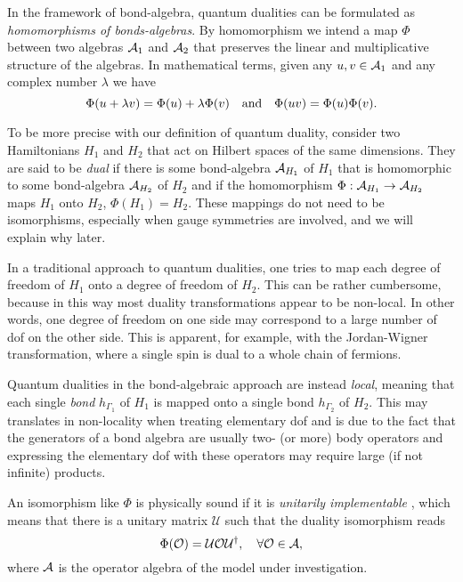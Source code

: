 In the framework of bond-algebra, quantum dualities can be formulated as \emph{homomorphisms of bonds-algebras}.
By homomorphism we intend a map $\Phi$ between two algebras $\mathcal{A}_1$ and $\mathcal{A}_2$ that preserves the linear and multiplicative structure of the algebras.
In mathematical terms, given any $u,v \in \mathcal{A}_1$ and any complex number $\lambda$ we have
\begin{equation*}
    \Phi(u + \lambda v) = \Phi(u) + \lambda \Phi(v)
    \qand
    \Phi(u v) = \Phi(u) \Phi(v).
\end{equation*}

To be more precise with our definition of quantum duality,
consider two Hamiltonians $H_1$ and $H_2$ that act on Hilbert spaces of the same dimensions.
They are said to be \emph{dual} if there is some bond-algebra $\mathcal{A}_{H_1}$ of $H_1$ that is homomorphic to some bond-algebra $\mathcal{A}_{H_2}$ of $H_2$ and if the homomorphism $\Phi : \mathcal{A}_{H_1} \to \mathcal{A}_{H_2}$ maps $H_1$ onto $H_2$, $\Phi(H_1) = H_2$.
These mappings do not need to be isomorphisms, especially when gauge symmetries are involved, and we will explain why later.

In a traditional approach to quantum dualities, one tries to map each degree of freedom of $H_1$ onto a degree of freedom of $H_2$.
This can be rather cumbersome, because in this way most duality transformations appear to be non-local.
In other words, one degree of freedom on one side may correspond to a large number of \ac{dof} on the other side.
This is apparent, for example, with the Jordan-Wigner transformation, where a single spin is dual to a whole chain of fermions.

Quantum dualities in the bond-algebraic approach are instead \emph{local}, meaning that each single \emph{bond} $h_{\Gamma_1}$ of $H_1$ is mapped onto a single bond $h_{\Gamma_2}$ of $H_2$.
This may translates in non-locality when treating elementary \ac{dof} and is due to the fact that the generators of a bond algebra are usually two- (or more) body operators and expressing the elementary \ac{dof} with these operators may require large (if not infinite) products.

An isomorphism like $\Phi$ is physically sound if it is \emph{unitarily implementable} \cite{cobanera2011bond}, which means that there is a unitary matrix $\mathcal{U}$ such that the duality isomorphism reads
\begin{equation}
    \Phi(\mathcal{O}) =
    \mathcal{U} \mathcal{O} \mathcal{U}^{\dagger}, \quad
    \forall \mathcal{O} \in \mathcal{A},
\end{equation}
where $\mathcal{A}$ is the operator algebra of the model under investigation.


